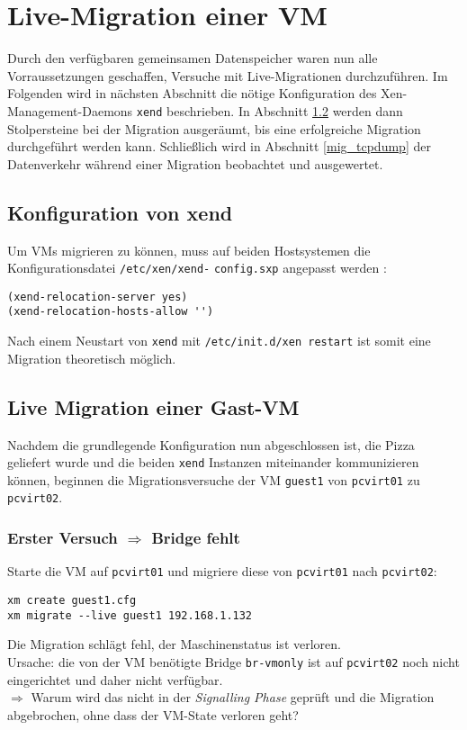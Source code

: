 \chapter{Live-Migration einer VM}
Durch den verfügbaren gemeinsamen Datenspeicher waren nun alle Vorraussetzungen geschaffen, Versuche mit Live-Migrationen durchzuführen. Im Folgenden wird in nächsten Abschnitt die nötige Konfiguration des Xen-Management-Daemons \verb#xend# beschrieben. In Abschnitt \ref{mig_vers} werden dann Stolpersteine bei der Migration ausgeräumt, bis eine erfolgreiche Migration durchgeführt werden kann. Schließlich wird in Abschnitt \ref{mig_tcpdump} der Datenverkehr während einer Migration beobachtet und ausgewertet.
\section{Konfiguration von xend}\label{xend_konfig}
Um VMs migrieren zu können, muss auf beiden Hostsystemen die Konfigurationsdatei \verb#/etc/xen/xend-# \verb#config.sxp# angepasst werden \cite{man_xendconfig}:
\setupVerbatimOut
\begin{verbatim}
(xend-relocation-server yes)
(xend-relocation-hosts-allow '')
\end{verbatim} 
Nach einem Neustart von \verb#xend# mit \verb#/etc/init.d/xen restart# ist somit eine Migration theoretisch möglich. 

\section{Live Migration einer Gast-VM}
\label{mig_vers}
Nachdem die grundlegende Konfiguration nun abgeschlossen ist, die Pizza geliefert wurde und die beiden \verb#xend# Instanzen miteinander kommunizieren können, beginnen die Migrationsversuche der VM \verb#guest1# von \verb#pcvirt01# zu \verb#pcvirt02#.

\subsection{Erster Versuch $\Rightarrow$ Bridge fehlt}
Starte die VM auf \verb#pcvirt01# und migriere diese von \verb#pcvirt01# nach \verb#pcvirt02#:
\setupVerbatimOut
\begin{verbatim}
xm create guest1.cfg
xm migrate --live guest1 192.168.1.132
\end{verbatim}

Die Migration schlägt fehl, der Maschinenstatus ist verloren. 
\\
Ursache: die von der VM benötigte Bridge \verb#br-vmonly# ist auf \verb#pcvirt02# noch nicht eingerichtet und daher nicht verfügbar.
\\
$\Rightarrow$ Warum wird das nicht in der \emph{Signalling Phase} geprüft und die Migration abgebrochen, ohne dass der VM-State verloren geht? 


